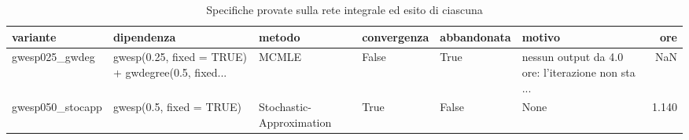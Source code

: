 \begin{table}
\centering
\caption{Specifiche provate sulla rete integrale ed esito di ciascuna}
\label{tab:t4_ergm_integrale_varianti}
\begin{tabular}{llllllr}
\toprule
        variante &                                         dipendenza &                   metodo &  convergenza &  abbandonata &                                             motivo &   ore \\
\midrule
  gwesp025\_gwdeg & gwesp(0.25, fixed = TRUE) + gwdegree(0.5, fixed... &                    MCMLE &        False &         True & nessun output da 4.0 ore: l'iterazione non sta ... &   NaN \\
gwesp050\_stocapp &                           gwesp(0.5, fixed = TRUE) & Stochastic-Approximation &         True &        False &                                               None & 1.140 \\
\bottomrule
\end{tabular}
\end{table}
